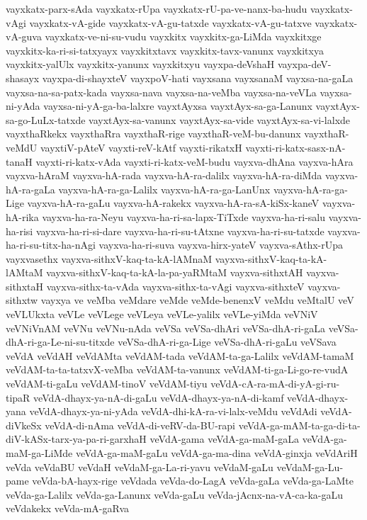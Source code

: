 {vayxkatx-parx-sAda
vayxkatx-rUpa
vayxkatx-rU-pa-ve-nanx-ba-hudu
vayxkatx-vAgi
vayxkatx-vA-gide
vayxkatx-vA-gu-tatxde
vayxkatx-vA-gu-tatxve
vayxkatx-vA-guva
vayxkatx-ve-ni-su-vudu
vayxkitx
vayxkitx-ga-LiMda
vayxkitxge
vayxkitx-ka-ri-si-tatxyayx
vayxkitxtavx
vayxkitx-tavx-vanunx
vayxkitxya
vayxkitx-yalUlx
vayxkitx-yanunx
vayxkitxyu
vayxpa-deVshaH
vayxpa-deV-shasayx
vayxpa-di-shayxteV
vayxpoV-hati
vayxsana
vayxsanaM
vayxsa-na-gaLa
vayxsa-na-sa-patx-kada
vayxsa-nava
vayxsa-na-veMba
vayxsa-na-veVLa
vayxsa-ni-yAda
vayxsa-ni-yA-ga-ba-lalxre
vayxtAyxsa
vayxtAyx-sa-ga-Lanunx
vayxtAyx-sa-go-LuLx-tatxde
vayxtAyx-sa-vanunx
vayxtAyx-sa-vide
vayxtAyx-sa-vi-lalxde
vayxthaRkekx
vayxthaRra
vayxthaR-rige
vayxthaR-veM-bu-danunx
vayxthaR-veMdU
vayxtiV-pAteV
vayxti-reV-kAtf
vayxti-rikatxH
vayxti-ri-katx-sasx-nA-tanaH
vayxti-ri-katx-vAda
vayxti-ri-katx-veM-budu
vayxva-dhAna
vayxva-hAra
vayxva-hAraM
vayxva-hA-rada
vayxva-hA-ra-dalilx
vayxva-hA-ra-diMda
vayxva-hA-ra-gaLa
vayxva-hA-ra-ga-Lalilx
vayxva-hA-ra-ga-LanUnx
vayxva-hA-ra-ga-Lige
vayxva-hA-ra-gaLu
vayxva-hA-rakekx
vayxva-hA-ra-sA-kiSx-kaneV
vayxva-hA-rika
vayxva-ha-ra-Neyu
vayxva-ha-ri-sa-lapx-TiTxde
vayxva-ha-ri-salu
vayxva-ha-risi
vayxva-ha-ri-si-dare
vayxva-ha-ri-su-tAtxne
vayxva-ha-ri-su-tatxde
vayxva-ha-ri-su-titx-ha-nAgi
vayxva-ha-ri-suva
vayxva-hirx-yateV
vayxva-sAthx-rUpa
vayxvasethx
vayxva-sithxV-kaq-ta-kA-lAMnaM
vayxva-sithxV-kaq-ta-kA-lAMtaM
vayxva-sithxV-kaq-ta-kA-la-pa-yaRMtaM
vayxva-sithxtAH
vayxva-sithxtaH
vayxva-sithx-ta-vAda
vayxva-sithx-ta-vAgi
vayxva-sithxteV
vayxva-sithxtw
vayxya
ve
veMba
veMdare
veMde
veMde-benenxV
veMdu
veMtalU
veV
veVLUkxta
veVLe
veVLege
veVLeya
veVLe-yalilx
veVLe-yiMda
veVNiV
veVNiVnAM
veVNu
veVNu-nAda
veVSa
veVSa-dhAri
veVSa-dhA-ri-gaLa
veVSa-dhA-ri-ga-Le-ni-su-titxde
veVSa-dhA-ri-ga-Lige
veVSa-dhA-ri-gaLu
veVSava
veVdA
veVdAH
veVdAMta
veVdAM-tada
veVdAM-ta-ga-Lalilx
veVdAM-tamaM
veVdAM-ta-ta-tatxvX-veMba
veVdAM-ta-vanunx
veVdAM-ti-ga-Li-go-re-vudA
veVdAM-ti-gaLu
veVdAM-tinoV
veVdAM-tiyu
veVdA-cA-ra-mA-di-yA-gi-ru-tipaR
veVdA-dhayx-ya-nA-di-gaLu
veVdA-dhayx-ya-nA-di-kamf
veVdA-dhayx-yana
veVdA-dhayx-ya-ni-yAda
veVdA-dhi-kA-ra-vi-lalx-veMdu
veVdAdi
veVdA-diVkeSx
veVdA-di-nAma
veVdA-di-veRV-da-BU-rapi
veVdA-ga-mAM-ta-ga-di-ta-diV-kASx-tarx-ya-pa-ri-garxhaH
veVdA-gama
veVdA-ga-maM-gaLa
veVdA-ga-maM-ga-LiMde
veVdA-ga-maM-gaLu
veVdA-ga-ma-dina
veVdA-ginxja
veVdAriH
veVda
veVdaBU
veVdaH
veVdaM-ga-La-ri-yavu
veVdaM-gaLu
veVdaM-ga-Lu-pame
veVda-bA-hayx-rige
veVdada
veVda-do-LagA
veVda-gaLa
veVda-ga-LaMte
veVda-ga-Lalilx
veVda-ga-Lanunx
veVda-gaLu
veVda-jAcnx-na-vA-ca-ka-gaLu
veVdakekx
veVda-mA-gaRva
}
